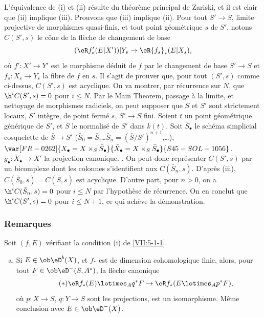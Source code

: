 L'équivalence de (i) et (ii) résulte du théorème principal de Zariski, 
et il est clair que (ii) implique (iii). Prouvons que (iii) implique (ii). Pour 
tout $S'\to S$, limite projective de morphismes quasi-finis, et tout point 
géométrique $s$ de $S'$, notons $C(S',s)$ le cône de la flèche de 
changement de base 
\[
  (\eR f_\ast'(E|X'))|Y_s \to \eR{f_s}_\ast (E|X_s) \text{,} 
\]
où $f':X'\to Y'$ est le morphisme déduit de $f$ par le changement de base 
$S'\to S$ et $f_s:X_s\to Y_s$ la fibre de $f$ en $s$. Il s'agit de prouver que, 
pour tout $(S',s)$ comme ci-dessus, $C(S',s)$ est acyclique. On va montrer, par 
récurrence sur $N$, que $\h^i C(S',s) = 0$ pour $i\leqslant N$. Par le Main 
Theorem, passage à la limite, et nettoyage de morphismes radiciels, on peut 
supposer que $S$ et $S'$ sont strictement locaux, $S'$ intègre, de point 
fermé $s$, $S'\to S$ fini. Soient $t$ un point géométrique générique 
de $S'$, et $\bar S$ le normalisé de $S'$ dans $k(t)$. Soit $\bar S_\bullet$ 
le schéma simplicial cosquelette de $\bar S\to S'$ 
($\bar S_0=\bar S$,\ldots $\bar S_n=(\bar S/S')^{n+1}$,\ldots), 
$\var[FR-0262]{X_\bullet=X\times_S \bar S_\bullet}{\bar X_\bullet=X\times_S \bar S_\bullet}{S45-SOL-1056}$. $g_\bullet:\bar X_\bullet \to X'$ la 
projection canonique.  . On 
peut donc représenter $C(S',s)$ par un bicomplexe dont les colonnes 
s'identifient aux $C(\bar S_n,s)$. D'après (iii), $C(\bar S_0,s)=C(\bar S,s)$ 
est acyclique. D'autre part, pour $n>0$, on a $\h^i C(\bar S_n,s)=0$ pour 
$i\leqslant N$ par l'hypothèse de récurrence. On en conclut que 
$\h^i C(S',s)=0$ pour $i\leqslant N+1$, ce qui achève la démonstration. 





\subsubsection{Remarques}\label{VII:5-1-2}

Soit $(f,E)$ vérifiant la condition (i) de \ref{VII:5-1-1}. 
\begin{enumerate}[a)]
  \item Si $E\in \ob \eD^b(X)$, et $f_\ast$ est de dimension cohomologique 
    finie, alors, pour tout $F\in \ob\eD^-(S,A^\circ)$, la flèche canonique 
    \begin{equation*}\tag{$*$}\label{VII:eq:5-1-1-1}
      \eR f_\ast(E)\lotimes_A q^\ast F \to \eR f_\ast(E\lotimes_A p^\ast F) \text{,} 
    \end{equation*}
    où $p:X\to S$, $q:Y\to S$ sont les projections, est un isomorphisme. 
    Même conclusion avec $E\in\ob\eD^-(X)$. 
\end{enumerate} 

